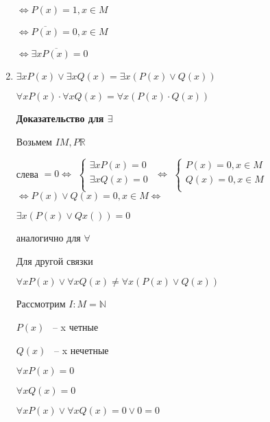 \documentclass[russian]{lecture-notes}
\begin{document}
\begin{enumerate}
{            $\Leftrightarrow P(x) = 1, x \in M$

            $\Leftrightarrow \overline{P(x)} = 0, x \in M$

            $\Leftrightarrow \exists x \overline{P(x)} = 0$
        }

        \item{
            $\exists x P(x) \lor \exists x Q(x) = \exists x (P(x) \lor Q(x))$

            $\forall x P(x) \cdot \forall x Q(x) = \forall x (P(x) \cdot Q(x))$

            \textbf{Доказательство для $\exists$}

            Возьмем $I M, P \mathbb{R}$



            слева $ = 0 \Leftrightarrow$
            $\left \{
            \begin{gathered}
                \exists x P(x) = 0 \\
                \exists x Q(x) = 0 \\
            \end{gathered}
            \right.$
            $\Leftrightarrow$
            $\left \{
            \begin{gathered}
                P(x) = 0, x \in M \\
                Q(x) = 0, x \in M \\
            \end{gathered}
            \right.$
            $\Leftrightarrow P(x) \lor Q(x) = 0, x \in M \Leftrightarrow$

            $\exists x (P(x) \lor Qx()) = 0$

            аналогично для $\forall$

            \begin{remark}
                Для другой связки

                $\forall x P(x) \lor \forall x Q(x) \neq \forall x (P(x) \lor Q(x))$

                Рассмотрим $I: M = \mathbb{N}$

                $P(x)$ ~-- x четные

                $Q(x)$ ~-- x нечетные

                $\forall x P(x) = 0$

                $\forall x Q(x) = 0$

                $\forall x P(x) \lor \forall x Q(x) = 0 \lor 0 = 0$


\end{remark}}
\end{enumerate}
\end{document}

